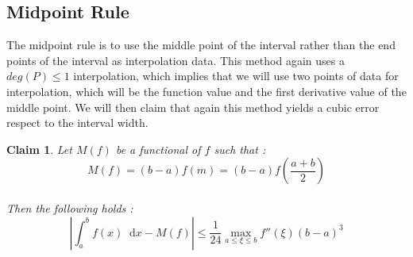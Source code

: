 \documentclass[paper=a4, fontsize=11pt]{scrartcl}
\newcommand*\dif{\mathop{}\!\mathrm{d}}
\newtheorem{claim}{Claim}
\begin{document}
\vspace{0.15in}
\subsection{Midpoint Rule}
\vspace{0.15in}

The midpoint rule is to use the middle point of the interval rather than the end points of the interval as interpolation data. This method again uses a $deg(P)\leq 1$ interpolation, which implies that we will use two points of data for interpolation, which will be the function value and the first derivative value of the middle point. We will then claim that again this method yields a cubic error respect to the interval width. \\

\begin{claim}
	Let $M(f)$ be a functional of $f$ such that : \\
	
	\begin{equation}\nonumber
		M(f) = (b-a) f(m) = (b-a) f(\frac{a+b}{2})
	\end{equation}\\
	
	Then the following holds : \\
	
	\begin{equation}\nonumber
		\left| \int_{a}^{b} f(x) \dif x - M(f) \right| \leq \frac{1}{24} \max_{a\leq\xi\leq b}f''(\xi) (b-a)^3
	\end{equation}\\
\end{claim}
\end{document}

